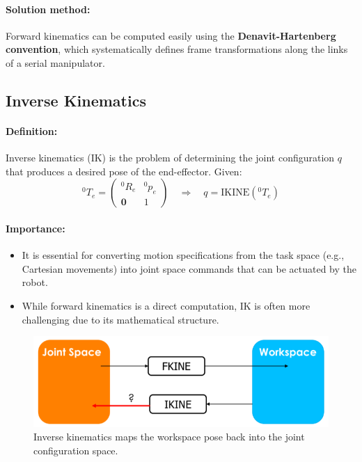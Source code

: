 \paragraph{Solution method:}
Forward kinematics can be computed easily using the \textbf{Denavit-Hartenberg convention}, which systematically defines frame transformations along the links of a serial manipulator.

\hfill

\subsection{Inverse Kinematics}

\paragraph{Definition:}
Inverse kinematics (IK) is the problem of determining the joint configuration $q$ that produces a desired pose of the end-effector. Given:
\[
{}^0T_e = 
\begin{pmatrix}
{}^0R_e & {}^0p_e \\
\mathbf{0} & 1
\end{pmatrix}
\quad \Rightarrow \quad q = \text{IKINE}({}^0T_e)
\]

\paragraph{Importance:}
\begin{itemize}
  \item It is essential for converting motion specifications from the task space (e.g., Cartesian movements) into joint space commands that can be actuated by the robot.
  \item While forward kinematics is a direct computation, IK is often more challenging due to its mathematical structure.
\end{itemize}

\begin{figure}[H]
  \centering
  \includegraphics[width=0.6\linewidth]{imgs/ikine_mapping.png}
  \caption{Inverse kinematics maps the workspace pose back into the joint configuration space.}
\end{figure}

